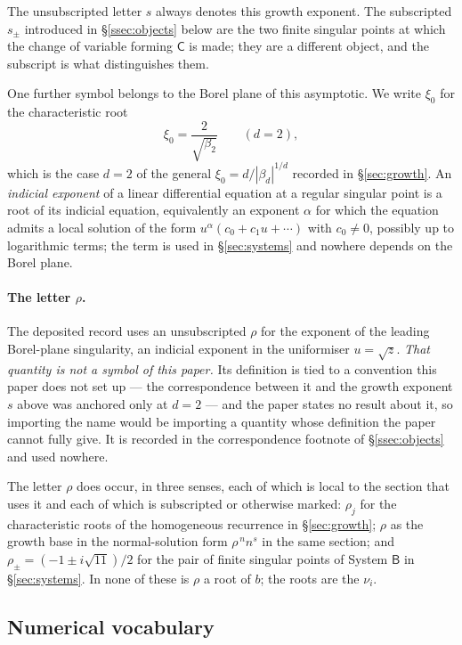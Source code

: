 The unsubscripted letter $s$ always denotes this growth exponent. The
subscripted $s_\pm$ introduced in \S\ref{ssec:objects} below are the two
finite singular points at which the change of variable forming $\mathsf C$ is
made; they are a different object, and the subscript is what distinguishes
them.

One further symbol belongs to the Borel plane of this asymptotic. We write
$\xi_0$ for the characteristic root
\[
  \xi_0=\frac{2}{\sqrt{\beta_2}}\qquad(d=2),
\]
which is the case $d=2$ of the general $\xi_0=d/|\beta_d|^{1/d}$ recorded in
\S\ref{sec:growth}. An \emph{indicial exponent} of a linear differential
equation at a regular singular point is a root of its indicial equation,
equivalently an exponent $\alpha$ for which the equation admits a local
solution of the form $u^{\alpha}(c_0+c_1u+\cdots)$ with $c_0\neq0$, possibly
up to logarithmic terms; the term is used in \S\ref{sec:systems} and nowhere
depends on the Borel plane.

\paragraph{The letter \texorpdfstring{$\rho$}{rho}.}
The deposited record uses an unsubscripted $\rho$ for the exponent of the
leading Borel-plane singularity, an indicial exponent in the uniformiser
$u=\sqrt z$. \emph{That quantity is not a symbol of this paper.} Its
definition is tied to a convention this paper does not set up --- the
correspondence between it and the growth exponent $s$ above was anchored only
at $d=2$ --- and the paper states no result about it, so importing the name
would be importing a quantity whose definition the paper cannot fully give.
It is recorded in the correspondence footnote of \S\ref{ssec:objects} and used
nowhere.

The letter $\rho$ does occur, in three senses, each of which is local to the
section that uses it and each of which is subscripted or otherwise marked:
$\rho_j$ for the characteristic roots of the homogeneous recurrence in
\S\ref{sec:growth}; $\rho$ as the growth base in the normal-solution form
$\rho^{\,n}n^{s}$ in the same section; and $\rho_\pm=(-1\pm i\sqrt{11})/2$ for
the pair of finite singular points of System $\mathsf B$ in
\S\ref{sec:systems}. In none of these is $\rho$ a root of $b$; the roots are
the $\nu_i$.

\subsection{Numerical vocabulary}\label{ssec:numerics}

